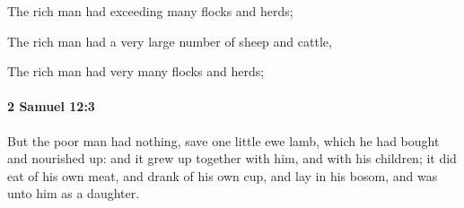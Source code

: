 			\begin{versebox}
					\item[BHS] 
					\item[ASV] The rich man had exceeding many flocks and herds;
					\item[NIV] The rich man had a very large number of sheep and cattle,
					\item[NRSV] The rich man had very many flocks and herds;
			\end{versebox}

		\paragraph{2 Samuel 12:3} %
			\label{2SAMUEL-12-3}

			But the poor man had nothing, save one little ewe lamb, which he had bought and nourished up: and it grew up together with him, and with his children; it did eat of his own meat, and drank of his own cup, and lay in his bosom, and was unto him as a daughter.

